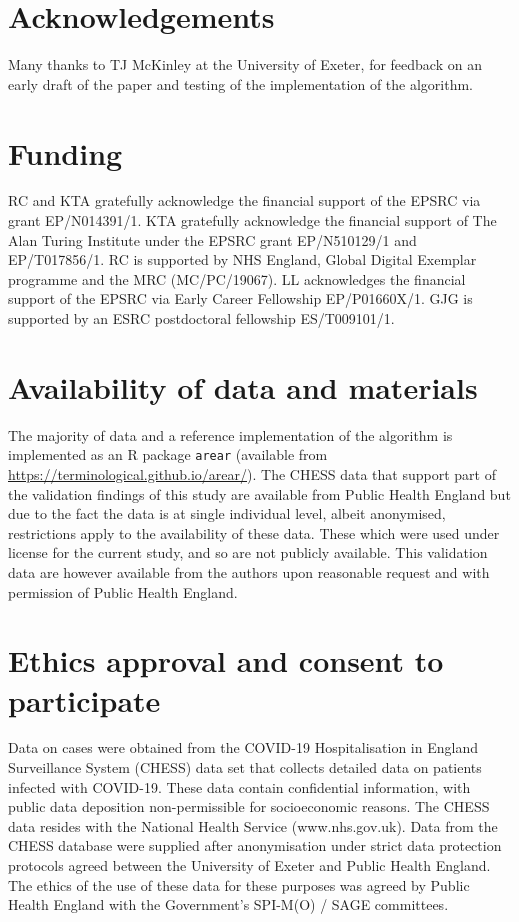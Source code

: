 \documentclass[twocolumn]{bmcart}%
\begin{document}
\begin{backmatter}

\section*{Acknowledgements}%
Many thanks to TJ McKinley at the University of
Exeter, for feedback on an early draft of the paper and testing of the
implementation of the algorithm.

\section*{Funding}%
RC and KTA gratefully acknowledge the financial support
of the EPSRC via grant EP/N014391/1. KTA gratefully acknowledge the
financial support of The Alan Turing Institute under the EPSRC grant
EP/N510129/1 and EP/T017856/1. RC is supported by NHS England, Global
Digital Exemplar programme and the MRC (MC/PC/19067). LL acknowledges
the financial support of the EPSRC via Early Career Fellowship
EP/P01660X/1. GJG is supported by an ESRC postdoctoral fellowship
ES/T009101/1.

\section*{Availability of data and materials}%
The majority of data and a reference implementation of the  algorithm 
is implemented as an R package \texttt{arear} (available from
\url{https://terminological.github.io/arear/}). The CHESS data that support
part of the validation findings of this study are available from Public Health England but
due to the fact the data is at single individual level, albeit anonymised,
restrictions apply to the availability of these data. These which were used
under license for the current study, and so are not publicly available.
This validation data are however available from the authors upon reasonable request and
with permission of Public Health England. 

\section*{Ethics approval and consent to participate}%
Data on cases were
obtained from the COVID-19 Hospitalisation in England Surveillance
System (CHESS) data set that collects detailed data on patients infected
with COVID-19. These data contain confidential information, with public
data deposition non-permissible for socioeconomic reasons. The CHESS
data resides with the National Health Service (www.nhs.gov.uk). Data
from the CHESS database were supplied after anonymisation under strict
data protection protocols agreed between the University of Exeter and
Public Health England. The ethics of the use of these data for these
purposes was agreed by Public Health England with the Government's
SPI-M(O) / SAGE committees.


\end{backmatter}
\end{document}

